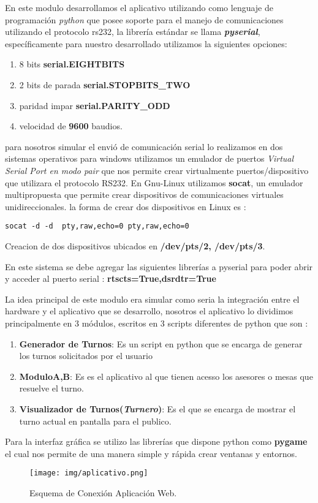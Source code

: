\documentclass[a4paper]{article}
\begin{document}
En este modulo desarrollamos el aplicativo utilizando como lenguaje de programación \emph{python} que posee soporte para el manejo de comunicaciones utilizando el protocolo rs232, la librería estándar se llama \textbf{\textit{pyserial}}, específicamente para nuestro desarrollado utilizamos la siguientes opciones:
\begin{enumerate}
\item 8 bits \textbf{serial.EIGHTBITS}
\item 2 bits de parada \textbf{serial.STOPBITS\_TWO}
\item paridad impar \textbf{serial.PARITY\_ODD}
\item velocidad de \textbf{9600} baudios.
\end{enumerate}

para nosotros simular el envió de comunicación serial lo realizamos en dos sistemas operativos para windows  utilizamos un emulador de puertos \emph{Virtual Serial Port en modo pair} que nos permite crear virtualmente puertos/dispositivo que utilizara el protocolo RS232. 
En Gnu-Linux utilizamos \textbf{socat}, un emulador multipropuesta que permite crear dispositivos de comunicaciones virtuales unidireccionales.
la forma de crear dos dispositivos en Linux es :
\begin{listing}[H]
	\begin{verbatim}
socat -d -d  pty,raw,echo=0 pty,raw,echo=0
\end{verbatim}
\caption{Creacion de dos dispositivos ubicados en \textbf{/dev/pts/2, /dev/pts/3}.}
    \label{socats}
\end{listing}

En este sistema se debe agregar las siguientes librerías a pyserial para poder abrir y acceder al puerto serial : \textbf{rtscts=True,dsrdtr=True}

La idea principal de este modulo era simular como seria la integración entre el hardware y el aplicativo que se desarrollo, nosotros el aplicativo lo dividimos principalmente en 3 módulos, escritos en 3 scripts diferentes de python  que son : 
\begin{enumerate}
\item \textbf{Generador de Turnos}: Es un script en python que se encarga de generar los turnos solicitados por el usuario
\item \textbf{ModuloA,B}: Es es el aplicativo al que tienen acesso los asesores o mesas que resuelve el turno. 
\item \textbf{Visualizador de Turnos(\textit{Turnero})}: Es el que se encarga de mostrar el turno actual en pantalla para el publico.
\end{enumerate}
Para la interfaz gráfica se utilizo las librerías que dispone python como \textbf{pygame} el cual nos permite de una manera simple y rápida crear ventanas y entornos.
\begin{figure}[H]
  \centering
     \texttt{[image: img/aplicativo.png]}
  \caption{Esquema de Conexión Aplicación Web.}
    \label{fig:senal}
\end{figure}
\end{document}
